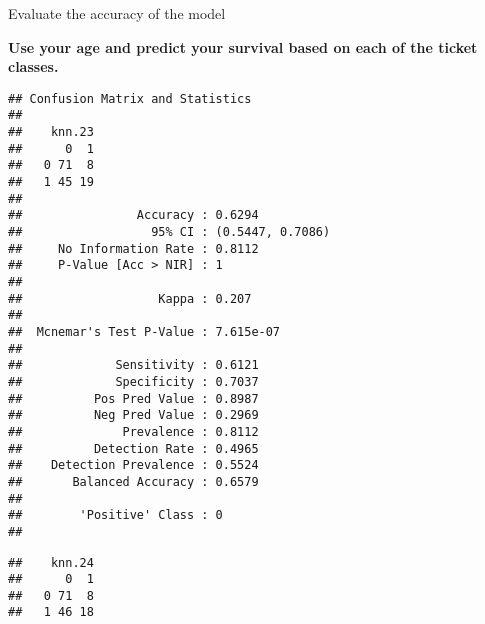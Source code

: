 \documentclass[
  ignorenonframetext,
]{beamer}
\newenvironment{Shaded}{\begin{snugshade}}{\end{snugshade}}
\newcommand{\FloatTok}[1]{\textcolor[rgb]{0.00,0.00,0.81}{#1}}
\newcommand{\FunctionTok}[1]{\textcolor[rgb]{0.00,0.00,0.00}{#1}}
\newcommand{\NormalTok}[1]{#1}
\newcommand{\SpecialCharTok}[1]{\textcolor[rgb]{0.00,0.00,0.00}{#1}}
\begin{document}
\begin{frame}[fragile]{Evaluate the accuracy of the model}
\begin{block}{\textbf{Use your age and predict your survival based on
each of the ticket classes.}}
\begin{verbatim}
## Confusion Matrix and Statistics
## 
##    knn.23
##      0  1
##   0 71  8
##   1 45 19
##                                           
##                Accuracy : 0.6294          
##                  95% CI : (0.5447, 0.7086)
##     No Information Rate : 0.8112          
##     P-Value [Acc > NIR] : 1               
##                                           
##                   Kappa : 0.207           
##                                           
##  Mcnemar's Test P-Value : 7.615e-07       
##                                           
##             Sensitivity : 0.6121          
##             Specificity : 0.7037          
##          Pos Pred Value : 0.8987          
##          Neg Pred Value : 0.2969          
##              Prevalence : 0.8112          
##          Detection Rate : 0.4965          
##    Detection Prevalence : 0.5524          
##       Balanced Accuracy : 0.6579          
##                                           
##        'Positive' Class : 0               
## 
\end{verbatim}

\begin{Shaded}
\end{Shaded}

\begin{verbatim}
##    knn.24
##      0  1
##   0 71  8
##   1 46 18
\end{verbatim}

\begin{Shaded}
\end{Shaded}


\end{block}
\end{frame}
\end{document}
